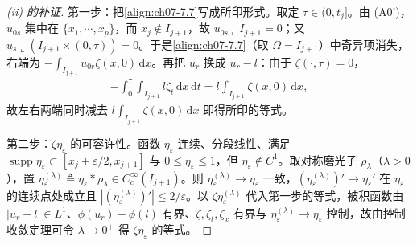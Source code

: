\documentclass[../../main.tex]{subfiles}%
\begin{document}
\begin{proof}[(ii) 的补证]
第一步：把\eqref{align:ch07-7.7}写成所印形式。取定 $\tau\in(0,t_j]$。由 (A0')，$u_{0s}$ 集中在 $\{x_1,\cdots,x_p\}$，而 $x_j\notin I_{j+1}$，故 $u_{0s}\llcorner I_{j+1}=0$；又 $u_s\llcorner(I_{j+1}\times(0,\tau))=0$。于是\eqref{align:ch07-7.7}（取 $\Omega=I_{j+1}$）中奇异项消失，右端为 $-\int_{I_{j+1}}u_{0r}\zeta(x,0)\,\mathrm{d}x$。再把 $u_r$ 换成 $u_r-l$：由于 $\zeta(\cdot,\tau)=0$，
\begin{align*}
-\int_0^\tau\int_{I_{j+1}}l\zeta_t\,\mathrm{d}x\,\mathrm{d}t=l\int_{I_{j+1}}\zeta(x,0)\,\mathrm{d}x,
\end{align*}
故左右两端同时减去 $l\int_{I_{j+1}}\zeta(x,0)\,\mathrm{d}x$ 即得所印的等式。

第二步：$\zeta\eta_\varepsilon$ 的可容许性。函数 $\eta_\varepsilon$ 连续、分段线性、满足 $\operatorname{supp}\eta_\varepsilon\subset[x_j+\varepsilon/2,x_{j+1}]$ 与 $0\leqslant\eta_\varepsilon\leqslant1$，但 $\eta_\varepsilon\notin C^1$。取对称磨光子 $\rho_\lambda$（$\lambda>0$），置 $\eta_\varepsilon^{(\lambda)}\triangleq\eta_\varepsilon*\rho_\lambda\in C^\infty_c(I_{j+1})$。则 $\eta_\varepsilon^{(\lambda)}\to\eta_\varepsilon$ 一致，$(\eta_\varepsilon^{(\lambda)})'\to\eta_\varepsilon'$ 在 $\eta_\varepsilon$ 的连续点处成立且 $|(\eta_\varepsilon^{(\lambda)})'|\leqslant2/\varepsilon$。以 $\zeta\eta_\varepsilon^{(\lambda)}$ 代入第一步的等式，被积函数由 $|u_r-l|\in L^1$、$\phi(u_r)-\phi(l)$ 有界、$\zeta,\zeta_t,\zeta_x$ 有界与 $\eta_\varepsilon^{(\lambda)}\to\eta_\varepsilon$ 控制，故由控制收敛定理可令 $\lambda\to0^+$ 得 $\zeta\eta_\varepsilon$ 的等式。


\end{proof}
\end{document}
